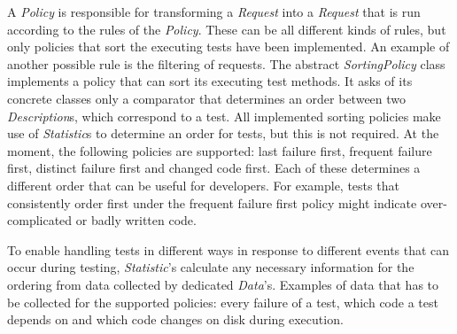 \documentclass[i2]{oss}
\newcommand{\class}[1]{\emph{#1}}
\begin{document}
A \class{Policy} is responsible for transforming a \class{Request} into a \class{Request} that is run according to the rules of the \class{Policy}. 
These can be all different kinds of rules, but only policies that sort the executing tests have been implemented. 
An example of another possible rule is the filtering of requests.
The abstract \class{SortingPolicy} class implements a policy that can sort its executing test methods. It asks of its concrete classes only a comparator that determines an order between two \class{Description}s, which correspond to a test.
All implemented sorting policies make use of \class{Statistic}s to determine
an order for tests, but this is not required.
At the moment, the following policies are supported: last failure first, 
frequent failure first, distinct failure first and changed code 
first.
Each of these determines a different order that can be useful for
developers.
For example, tests that consistently order first under the frequent
failure first policy might indicate over-complicated or badly written code. 

To enable handling tests in different ways in response to different 
events that can occur during testing, \class{Statistic}'s calculate any 
necessary information for the ordering from data collected by dedicated 
\class{Data}'s. %
Examples of data that has to be collected for the supported policies: 
every failure of a test, which code a test depends on and which code 
changes on disk during execution.
\end{document}
